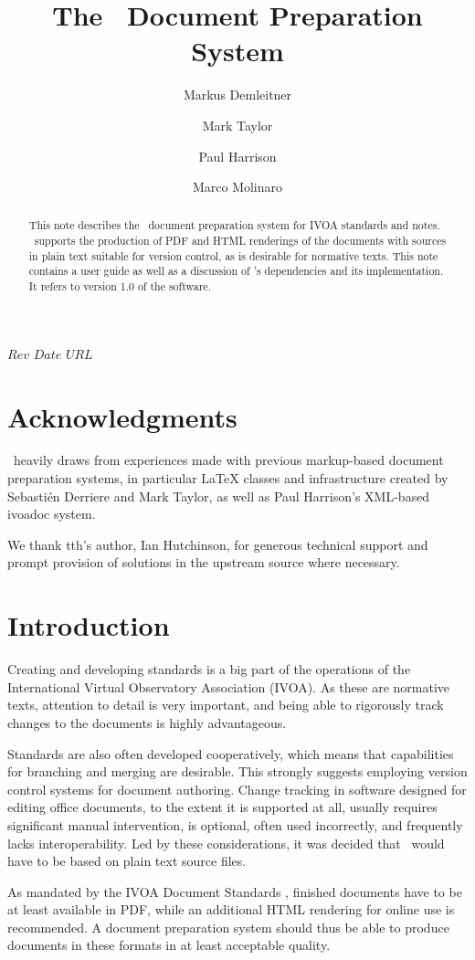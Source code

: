 \documentclass[11pt,a4paper]{ivoa}
\title{The \ivoatex\ Document Preparation System}
\author[http://www.ivoa.net/cgi-bin/twiki/bin/view/IVOA/MarkusDemleitner]{Markus Demleitner}
\author[http://www.ivoa.net/cgi-bin/twiki/bin/view/IVOA/MarkTaylor]{Mark Taylor}
\author[http://www.ivoa.net/cgi-bin/twiki/bin/view/IVOA/PaulHarrison]{Paul Harrison}
\author[http://www.ivoa.net/cgi-bin/twiki/bin/view/IVOA/MarcoMolinaro]{Marco Molinaro}
\begin{document}
\SVN$Rev$
\SVN$Date$
\SVN$URL$

\begin{abstract}
This note describes the \ivoatex\ document preparation system for IVOA
standards and notes.  \ivoatex\ supports the production of
PDF and HTML renderings of the documents with sources in
plain text suitable for version control, as is desirable for normative
texts.  This note contains a user guide as well as a discussion of 
\ivoatex's dependencies and its implementation.  It refers to version
1.0 of the software.
\end{abstract}


\section*{Acknowledgments}

\ivoatex\ heavily draws from experiences made with previous markup-based
document preparation systems, in particular LaTeX classes and
infrastructure created by Sebasti\'en Derriere and Mark Taylor, as well
as Paul Harrison's XML-based ivoadoc system.

We thank tth's author, Ian Hutchinson, for generous technical support
and prompt provision of solutions in the upstream source where necessary.

\section{Introduction}

Creating and developing standards is a  big part of the operations of
the International Virtual Observatory Association (IVOA).
As these are normative texts, attention to detail is very important, and
being able to rigorously track changes to the documents is highly
advantageous.  

Standards are also often developed cooperatively, which means that
capabilities for branching and merging are desirable.  This strongly
suggests employing version control systems for document authoring.
Change tracking in software designed for editing office documents, to
the extent it is supported at all, usually requires significant
manual intervention, is optional, often used incorrectly, and frequently
lacks interoperability.  Led by these considerations, it was decided that
\ivoatex\ would have to be based on plain text source files.

As mandated by the IVOA Document Standards \citep{std:docSTD}, 
finished documents have to be at
least available in PDF, while an additional HTML rendering for online
use is recommended.  A document preparation system should thus be
able  to produce documents in these formats in at least acceptable
quality.
\end{document}

